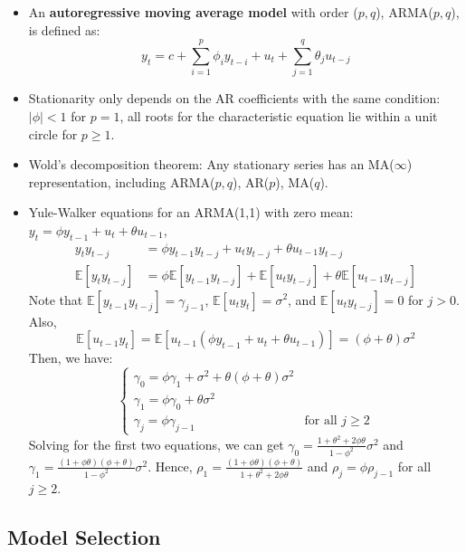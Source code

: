 \documentclass[notitlepage]{article}
\begin{document}
\begin{itemize}
    \item An \textbf{autoregressive moving average model} with order (\(p,q\)), ARMA(\(p,q\)), is defined as:
    \[
    y_t = c + \sum_{i=1}^p \phi_i y_{t-i} + u_t + \sum_{j=1}^q \theta_j u_{t-j}
    \]
    \item Stationarity only depends on the AR coefficients with the same condition: \(|\phi| < 1\) for \(p=1\), all roots for the characteristic equation lie within a unit circle for \(p \ge 1\).
    \item Wold’s decomposition theorem: Any stationary series has an MA(\(\infty\)) representation, including ARMA(\(p,q\)), AR(\(p\)), MA(\(q\)).
    \item Yule-Walker equations for an ARMA(1,1) with zero mean: \(y_t = \phi y_{t-1} + u_t + \theta u_{t-1}\),
    \begin{align*}
        y_t y_{t-j} &= \phi y_{t-1} y_{t-j} + u_t y_{t-j} + \theta u_{t-1}y_{t-j} \\
        \mathbb{E}[y_t y_{t-j}] &= \phi \mathbb{E}[y_{t-1} y_{t-j}] + \mathbb{E}[u_t y_{t-j}] + \theta \mathbb{E}[u_{t-1}y_{t-j}]
    \end{align*}
    Note that \(\mathbb{E}[y_{t-1} y_{t-j}] = \gamma_{j-1}\), \(\mathbb{E}[u_t y_{t}] = \sigma^2\), and \(\mathbb{E}[u_t y_{t-j}] = 0\) for \(j>0\). Also,
    \[
    \mathbb{E}[u_{t-1} y_t] = \mathbb{E}[u_{t-1} (\phi y_{t-1} + u_t + \theta u_{t-1})] = (\phi+\theta)\sigma^2
    \]
    Then, we have:
    \[
    \begin{cases}
        \gamma_0 = \phi \gamma_1 + \sigma^2 + \theta (\phi+\theta)\sigma^2 \\
        \gamma_1 = \phi \gamma_0 + \theta \sigma^2 \\
        \gamma_j = \phi \gamma_{j-1} &\text{for all } j\ge2
    \end{cases}
    \]
    Solving for the first two equations, we can get \(\gamma_0 = \frac{1+\theta^2+2\phi\theta}{1-\phi^2}\sigma^2\) and \(\gamma_1 = \frac{(1+\phi\theta)(\phi+\theta)}{1-\phi^2}\sigma^2\). Hence, \(\rho_1 = \frac{(1+\phi\theta)(\phi+\theta)}{1+\theta^2+2\phi\theta}\) and \(\rho_j = \phi \rho_{j-1}\) for all \(j \ge 2\).
\end{itemize}

\subsection{Model Selection}
\end{document}
